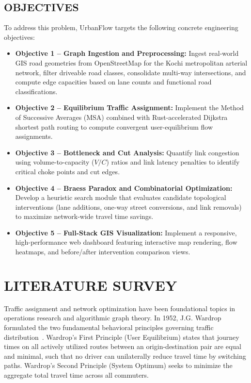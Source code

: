\documentclass[12pt,a4paper]{report}
\begin{document}
\section{OBJECTIVES}
To address this problem, UrbanFlow targets the following concrete engineering objectives:
\begin{itemize}
  \item \textbf{Objective 1 -- Graph Ingestion and Preprocessing:} Ingest real-world GIS road geometries from OpenStreetMap for the Kochi metropolitan arterial network, filter driveable road classes, consolidate multi-way intersections, and compute edge capacities based on lane counts and functional road classifications.
  \item \textbf{Objective 2 -- Equilibrium Traffic Assignment:} Implement the Method of Successive Averages (MSA) combined with Rust-accelerated Dijkstra shortest path routing to compute convergent user-equilibrium flow assignments.
  \item \textbf{Objective 3 -- Bottleneck and Cut Analysis:} Quantify link congestion using volume-to-capacity ($V/C$) ratios and link latency penalties to identify critical choke points and cut edges.
  \item \textbf{Objective 4 -- Braess Paradox and Combinatorial Optimization:} Develop a heuristic search module that evaluates candidate topological interventions (lane additions, one-way street conversions, and link removals) to maximize network-wide travel time savings.
  \item \textbf{Objective 5 -- Full-Stack GIS Visualization:} Implement a responsive, high-performance web dashboard featuring interactive map rendering, flow heatmaps, and before/after intervention comparison views.
\end{itemize}

\chapter{LITERATURE SURVEY}
\label{chap:literature}
Traffic assignment and network optimization have been foundational topics in operations research and algorithmic graph theory. In 1952, J.G. Wardrop formulated the two fundamental behavioral principles governing traffic distribution~\cite{wardrop1952}. Wardrop's First Principle (User Equilibrium) states that journey times on all actively utilized routes between an origin-destination pair are equal and minimal, such that no driver can unilaterally reduce travel time by switching paths. Wardrop's Second Principle (System Optimum) seeks to minimize the aggregate total travel time across all commuters. 
\end{document}
